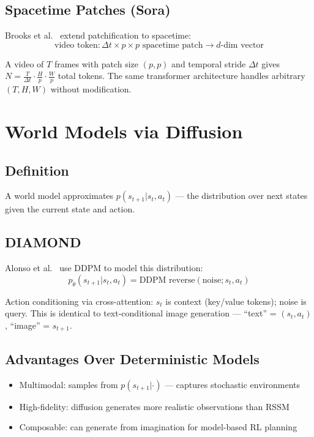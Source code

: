 \documentclass[11pt, a4paper]{article}
\theoremstyle{definition}
\begin{document}
\subsection{Spacetime Patches (Sora)}

Brooks et al.~\cite{brooks2024sora} extend patchification to spacetime:
\begin{equation}
  \text{video token}: \Delta t \times p \times p \text{ spacetime patch} \to d\text{-dim vector}
\end{equation}

A video of $T$ frames with patch size $(p, p)$ and temporal stride $\Delta t$ gives
$N = \frac{T}{\Delta t} \cdot \frac{H}{p} \cdot \frac{W}{p}$ total tokens. The same
transformer architecture handles arbitrary $(T, H, W)$ without modification.

\section{World Models via Diffusion}

\subsection{Definition}

A world model approximates $p(s_{t+1} | s_t, a_t)$ — the distribution over next states
given the current state and action.

\subsection{DIAMOND}

Alonso et al.~\cite{alonso2024diamond} use DDPM to model this distribution:
\begin{equation}
  p_\theta(s_{t+1} | s_t, a_t) = \text{DDPM reverse}(\text{noise}; s_t, a_t)
\end{equation}

Action conditioning via cross-attention: $s_t$ is context (key/value tokens); noise is query.
This is identical to text-conditional image generation — ``text'' = $(s_t, a_t)$,
``image'' = $s_{t+1}$.

\subsection{Advantages Over Deterministic Models}

\begin{itemize}
  \item Multimodal: samples from $p(s_{t+1}|\cdot)$ — captures stochastic environments
  \item High-fidelity: diffusion generates more realistic observations than RSSM
  \item Composable: can generate from imagination for model-based RL planning
\end{itemize}
\end{document}
